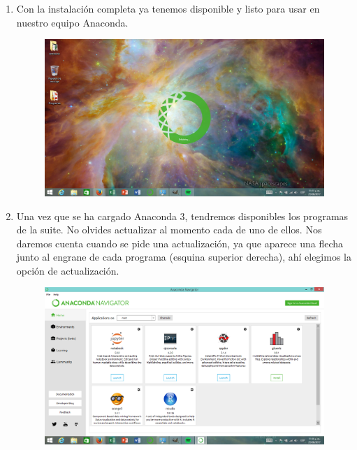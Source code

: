 \documentclass[12pt]{article}
\begin{document}
\begin{enumerate}
\item Con la instalación completa ya tenemos disponible y listo para usar en nuestro equipo Anaconda.
\begin{figure}[H]
	\centering
	\includegraphics[scale=0.25]{Imagenes/Instalacion_Anaconda_Windows_11} 
\end{figure}
\item Una vez que se ha cargado Anaconda 3, tendremos disponibles los programas de la suite. No olvides actualizar al momento cada de uno de ellos. Nos daremos cuenta cuando se pide una actualización, ya que aparece una flecha junto al engrane de cada programa (esquina superior derecha), ahí elegimos la opción de actualización.
\begin{figure}[H]
	\centering
	\includegraphics[scale=0.25]{Imagenes/Instalacion_Anaconda_Windows_12} 
\end{figure}
\end{enumerate}
\end{document}
